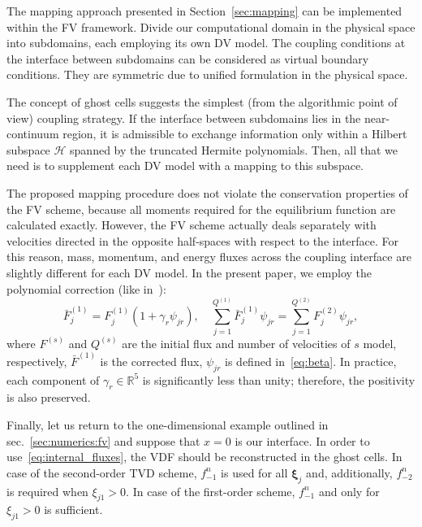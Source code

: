 \documentclass[]{elsarticle} %
\newcommand{\bxi}{\boldsymbol{\xi}}
\begin{document}
The mapping approach presented in Section~\ref{sec:mapping} can be implemented within the FV framework.
Divide our computational domain in the physical space into subdomains, each employing its own DV model.
The coupling conditions at the interface between subdomains can be considered as virtual boundary conditions.
They are symmetric due to unified formulation in the physical space.

The concept of ghost cells suggests the simplest (from the algorithmic point of view) coupling strategy.
If the interface between subdomains lies in the near-continuum region,
it is admissible to exchange information only within a Hilbert subspace \(\mathcal{H}\)
spanned by the truncated Hermite polynomials.
Then, all that we need is to supplement each DV model with a mapping to this subspace.

The proposed mapping procedure does not violate the conservation properties of the FV scheme,
because all moments required for the equilibrium function are calculated exactly.
However, the FV scheme actually deals separately with velocities
directed in the opposite half-spaces with respect to the interface.
For this reason, mass, momentum, and energy fluxes across the coupling interface
are slightly different  for each DV model.
In the present paper, we employ the polynomial correction (like in~\cite{Aristov1980}):
\begin{equation}\label{eq:poly_correction}
    \bar{F}^{(1)}_j = F^{(1)}_j(1+\gamma_r\psi_{j r}), \quad
    \sum_{j=1}^{Q^{(1)}} \bar{F}^{(1)}_j\psi_{j r} = \sum_{j=1}^{Q^{(2)}} F^{(2)}_j\psi_{j r},
\end{equation}
where \(F^{(s)}\) and \(Q^{(s)}\) are the initial flux and number of velocities of \(s\) model, respectively,
\(\bar{F}^{(1)}\) is the corrected flux, \(\psi_{j r}\) is defined in~\eqref{eq:beta}.
In practice, each component of \(\gamma_r\in\mathbb{R}^5\) is significantly less than unity;
therefore, the positivity is also preserved.

Finally, let us return to the one-dimensional example outlined in sec.~\ref{sec:numerics:fv}
and suppose that \(x=0\) is our interface.
In order to use~\eqref{eq:internal_fluxes}, the VDF should be reconstructed in the ghost cells.
In case of the second-order TVD scheme, \(f_{-1}^n\) is used for all \(\bxi_j\) and, additionally,
\(f_{-2}^n\) is required when \(\xi_{j1}>0\).
In case of the first-order scheme, \(f_{-1}^n\) and only for \(\xi_{j1}>0\) is sufficient.
\end{document}
